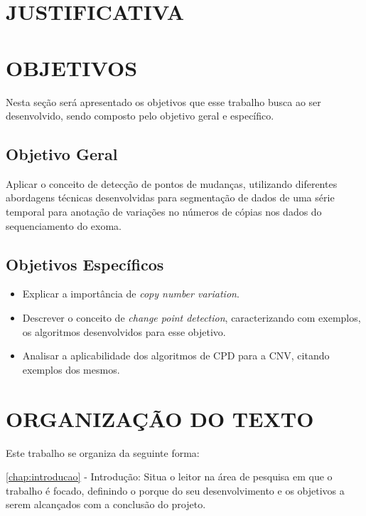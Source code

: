 \section{JUSTIFICATIVA}

\section{OBJETIVOS}

Nesta seção será apresentado os objetivos que esse trabalho busca ao ser desenvolvido, sendo composto pelo objetivo geral e específico.

\subsection{Objetivo Geral}

Aplicar o conceito de detecção de pontos de mudanças, utilizando diferentes abordagens técnicas desenvolvidas para segmentação de dados de uma série temporal para anotação de variações no números de cópias nos dados do sequenciamento do exoma.

\subsection{Objetivos Específicos}
	
\begin{itemize}
    \item Explicar a importância de \textit{copy number variation}.
    \item Descrever o conceito de \textit{change point detection}, caracterizando com exemplos, os algoritmos desenvolvidos para esse objetivo.
    \item Analisar a aplicabilidade dos algoritmos de CPD para a CNV, citando exemplos dos mesmos.
\end{itemize}

\section{ORGANIZAÇÃO DO TEXTO}

Este trabalho se organiza da seguinte forma:

\autoref{chap:introducao} - Introdução: Situa o leitor na área de pesquisa em que o trabalho é focado, definindo o porque do seu desenvolvimento e os objetivos a serem alcançados com a conclusão do projeto.

